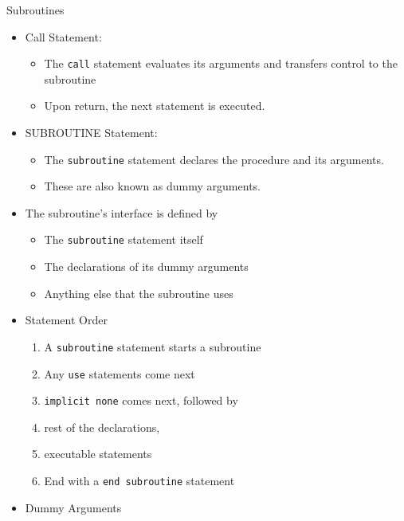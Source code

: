 \documentclass[c,mathserif,compress,xcolor=svgnames]{beamer}
\newcommand{\lstfortran}[1]{\lstinline[language={[90]Fortran},basicstyle=\footnotesize\ttfamily]|#1|}
\begin{document}
\begin{frame}{Subroutines}
  \begin{itemize}
    \item Call Statement: 
      \begin{itemize}
        \item The \lstfortran{call} statement evaluates its arguments and transfers control to the subroutine\\
        \item Upon return, the next statement is executed.
      \end{itemize}
    \item SUBROUTINE Statement:
      \begin{itemize}
        \item The \lstfortran{subroutine} statement declares the procedure and its arguments.\\
        \item These are also known as dummy arguments.
      \end{itemize}
    \item The subroutine's interface is defined by
      \begin{itemize}
        \item The \lstfortran{subroutine} statement itself
        \item The declarations of its dummy arguments
        \item Anything else that the subroutine uses
      \end{itemize}
      \framebreak
    \item Statement Order
      \begin{enumerate}
        \item A \lstfortran{subroutine} statement starts a subroutine
        \item Any \lstfortran{use} statements come next
        \item \lstfortran{implicit none} comes next, followed by
        \item rest of the declarations,
        \item executable statements
        \item End with a \lstfortran{end subroutine} statement
      \end{enumerate}
    \item Dummy Arguments

\end{itemize}
\end{frame}
\end{document}
